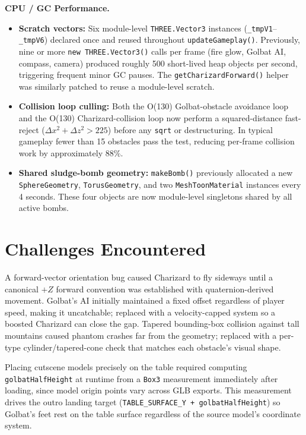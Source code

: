 \documentclass[11pt,a4paper]{article}
\begin{document}
\medskip
\textbf{CPU / GC Performance.}
\begin{itemize}[leftmargin=*, itemsep=2pt]
    \item \textbf{Scratch vectors:} Six module-level \texttt{THREE.Vector3}
          instances (\texttt{\_tmpV1}--\texttt{\_tmpV6}) declared once and
          reused throughout \texttt{updateGameplay()}. Previously, nine or more
          \texttt{new THREE.Vector3()} calls per frame (fire glow, Golbat AI,
          compass, camera) produced roughly 500 short-lived heap objects per
          second, triggering frequent minor GC pauses. The \texttt{getCharizardForward()}
          helper was similarly patched to reuse a module-level scratch.
    \item \textbf{Collision loop culling:} Both the O(130) Golbat-obstacle
          avoidance loop and the O(130) Charizard-collision loop now perform a
          squared-distance fast-reject (\(\Delta x^2 + \Delta z^2 > 225\)) before
          any \texttt{sqrt} or destructuring. In typical gameplay fewer than 15
          obstacles pass the test, reducing per-frame collision work by
          approximately 88\%.
    \item \textbf{Shared sludge-bomb geometry:} \texttt{makeBomb()} previously
          allocated a new \texttt{SphereGeometry}, \texttt{TorusGeometry}, and two
          \texttt{MeshToonMaterial} instances every 4 seconds. These four objects
          are now module-level singletons shared by all active bombs.
\end{itemize}

\section{Challenges Encountered}

A forward-vector orientation bug caused Charizard to fly sideways until a
canonical \(+Z\) forward convention was established with quaternion-derived
movement. Golbat's AI initially maintained a fixed offset regardless of player
speed, making it uncatchable; replaced with a velocity-capped system so a boosted
Charizard can close the gap. Tapered bounding-box collision against tall mountains
caused phantom crashes far from the geometry; replaced with a per-type
cylinder/tapered-cone check that matches each obstacle's visual shape.

Placing cutscene models precisely on the table required computing
\texttt{golbatHalfHeight} at runtime from a \texttt{Box3} measurement
immediately after loading, since model origin points vary across GLB exports.
This measurement drives the outro landing target
(\texttt{TABLE\_SURFACE\_Y + golbatHalfHeight}) so Golbat's feet rest on the table
surface regardless of the source model's coordinate system.
\end{document}
